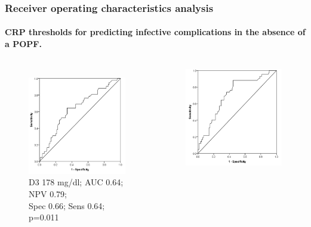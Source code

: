 \documentclass[10pt]{beamer}
\begin{document}
\begin{frame}
	\frametitle{Receiver operating characteristics analysis}
	\framesubtitle{CRP thresholds for predicting infective complications in the absence of a POPF. }
	\begin{columns}
			\begin{figure}
				\includegraphics[width=\textwidth]{../Figures/crp_comp_ROC_infection_D3}
				\\{\scriptsize D3 178 mg/dl; AUC 0.64; NPV 0.79; \\Spec 0.66; Sens 0.64; p=0.011}
			\end{figure}
			\begin{figure}
				\includegraphics[width=\textwidth]{../Figures/crp_comp_ROC_infection_D4}

\end{figure}
\end{columns}
\end{frame}
\end{document}
